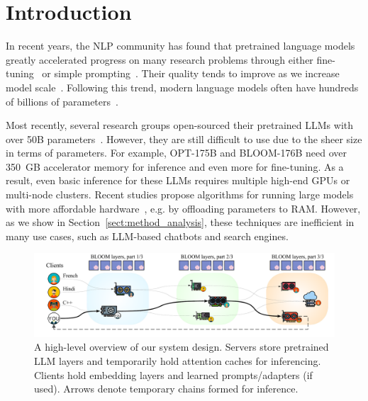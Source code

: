 \section{Introduction}

In recent years, the NLP community has found that pretrained language models greatly accelerated progress on many research problems through either fine-tuning~\citep{gpt} or simple prompting~\citep{gpt3}. Their quality tends to improve as we increase model scale~\citep{gpt2, kaplan2020scaling}. Following this trend, modern language models often have hundreds of billions of parameters~\citep{gpt3,gopher,pangua,hyperclova}\nocite{switch,jurrasic,Lepikhin2020GShardSG,glam}.

Most recently, several research groups open-sourced their pretrained LLMs with over 50B parameters~\citep{opt,bloom,llama,llama2}\nocite{gpt,gpt-neox-20b,zeng2020glm,galactica,yalm,switch}.
However, they are still difficult to use due to the sheer size in terms of parameters. For example, OPT-175B and BLOOM-176B need over 350~GB accelerator memory for inference and even more for fine-tuning. As a result, even basic inference for these LLMs requires multiple high-end GPUs or multi-node clusters\nocite{megatron2}. Recent studies propose algorithms for running large models with more affordable hardware~\citep{l2l,zerooffload}\nocite{accelerate}, e.g. by offloading parameters to RAM. However, as we show in Section~\ref{sect:method_analysis}, these techniques are inefficient in many use cases, such as LLM-based chatbots and search engines.

\begin{figure}[t]
    \centering
    \vspace{-5px}\includegraphics[width=\linewidth]{resources/bloom_swarm_eyeless.pdf} %
    \vspace{-20px}\caption{A high-level overview of our system design. Servers store pretrained LLM layers and temporarily hold attention caches for inferencing. Clients hold embedding layers and learned prompts/adapters (if used).
    Arrows denote temporary chains formed for inference.}
    \vspace{-15px}
    \label{fig:algorithm}
\end{figure}

